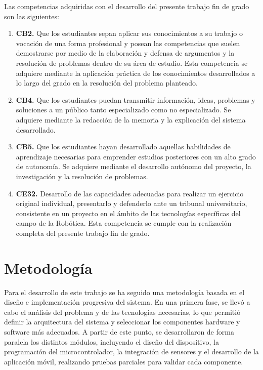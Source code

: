 Las competencias adquiridas con el desarrollo del presente trabajo fin de grado son las siguientes:

\begin{enumerate}
    \item \textbf{CB2.} Que los estudiantes sepan aplicar sus conocimientos a su trabajo o vocación de una forma profesional y posean las competencias que suelen demostrarse por medio de la elaboración y defensa de argumentos y la resolución de problemas dentro de su área de estudio. Esta competencia se adquiere mediante la aplicación práctica de los conocimientos desarrollados a lo largo del grado en la resolución del problema planteado.

    \item \textbf{CB4.} Que los estudiantes puedan transmitir información, ideas, problemas y soluciones a un público tanto especializado como no especializado. Se adquiere mediante la redacción de la memoria y la explicación del sistema desarrollado.

    \item \textbf{CB5.} Que los estudiantes hayan desarrollado aquellas habilidades de aprendizaje necesarias para emprender estudios posteriores con un alto grado de autonomía. Se adquiere mediante el desarrollo autónomo del proyecto, la investigación y la resolución de problemas.

    \item \textbf{CE32.} Desarrollo de las capacidades adecuadas para realizar un ejercicio original individual, presentarlo y defenderlo ante un tribunal universitario, consistente en un proyecto en el ámbito de las tecnologías específicas del campo de la Robótica. Esta competencia se cumple con la realización completa del presente trabajo fin de grado.
\end{enumerate}
 
\section{Metodología}
\label{sec:metodologia}

Para el desarrollo de este trabajo se ha seguido una metodología basada en el diseño e implementación progresiva del sistema. En una primera fase, se llevó a cabo el análisis del problema y de las tecnologías necesarias, lo que permitió definir la arquitectura del sistema y seleccionar los componentes hardware y software más adecuados. A partir de este punto, se desarrollaron de forma paralela los distintos módulos, incluyendo el diseño del dispositivo, la programación del microcontrolador, la integración de sensores y el desarrollo de la aplicación móvil, realizando pruebas parciales para validar cada componente.\\

